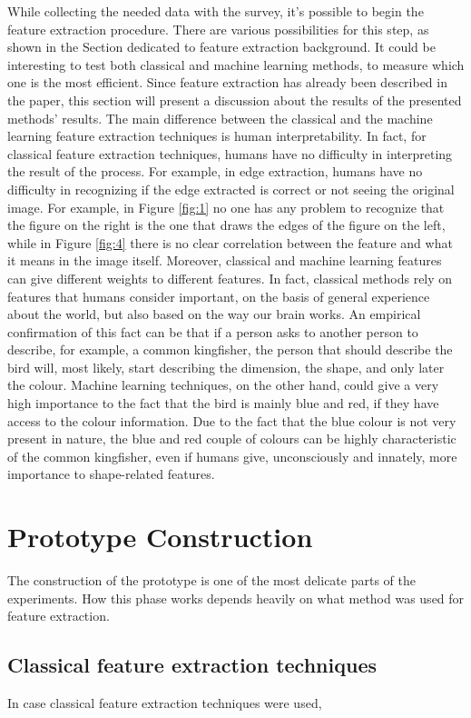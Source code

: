 \documentclass[conference]{IEEEtran}
\begin{document}
	While collecting the needed data with the survey, it's possible to begin the feature extraction procedure. There are various possibilities for this step, as shown in the Section dedicated to feature extraction background. 
	It could be interesting to test both classical and machine learning methods, to measure which one is the most efficient. Since feature extraction has already been described in the paper, this section will 
	present a discussion about the results of the presented methods' results. The main difference between the classical and the machine learning feature extraction techniques is human interpretability. 
	In fact, for classical feature extraction techniques, humans have no difficulty in interpreting the result of the process. For example, in edge extraction, humans have no difficulty in recognizing if the 
	edge extracted is correct or not seeing the original image. For example, in Figure \ref{fig:1} no one has any problem to recognize that the figure on the right is the one that draws the edges of the figure on the left, 
	while in Figure \ref{fig:4} there is no clear correlation between the feature and what it means in the image itself.
	Moreover, classical and machine learning features can give different weights to different features. 
	In fact, classical methods rely on features that humans consider important, on the basis of general experience about the world, but also based on the way our brain works. An empirical confirmation of this fact 
	can be that if a person asks to another person to describe, for example, a common kingfisher, the person that should describe the bird will, most likely, start describing the dimension, the shape, and only 
	later the colour. Machine learning techniques, on the other hand, could give a very high importance to the fact that the bird is mainly blue and red, if they have access to the colour information. Due to the fact that 
	the blue colour is not very present in nature, the blue and red couple of colours can be highly characteristic of the common kingfisher, even if humans give, unconsciously and innately, more importance to 
	shape-related features.	

\section{Prototype Construction}

	The construction of the prototype is one of the most delicate parts of the experiments. How this phase works depends heavily on what method was used for feature extraction. 
	
	\subsection{Classical feature extraction techniques}
	
		In case classical feature extraction techniques were used, 



\nocite{*}
\printbibliography
\end{document}
